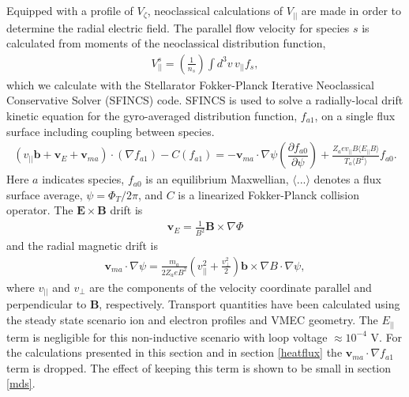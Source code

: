 \documentclass{article}
\newcommand{\partder}[2]{\dfrac{\partial  #1}{\partial  #2}} %
\begin{document}
Equipped with a profile of $V_{\zeta}$, neoclassical calculations of $V_{||}$ are made in order to determine the radial electric field. The parallel flow velocity for species $s$ is calculated from moments of the neoclassical distribution function,
\begin{gather}
V^s_{||} = \left(\frac{1}{n_s}\right
) \int d^3 v \, v_{||} f_s,
\end{gather}
which we calculate with the Stellarator Fokker-Planck Iterative Neoclassical Conservative Solver (SFINCS) \cite{Landreman2014} code.
SFINCS is used to solve a radially-local drift kinetic equation for the gyro-averaged distribution function, $f_{a1}$, on a single flux surface including coupling between species. 
\begin{gather}
( v_{||} \bm{b} + \bm{v}_E + \bm{v}_{ma}) \cdot (\nabla f_{a1})  - C(f_{a1}) = - \bm{v}_{ma} \cdot \nabla \psi \left( \partder{f_{a0}}{\psi} \right) + \frac{Z_a e v_{||} B \langle E_{||} B \rangle}{T_a \langle B^2 \rangle } f_{a0}.
\end{gather} \label{kineticequation}
\hspace{-1mm}
Here $a$ indicates species, $f_{a0}$ is an equilibrium Maxwellian, $ \langle ... \rangle$ denotes a flux surface average, $\psi = \Phi_T/2\pi$, and $C$ is a linearized Fokker-Planck collision operator. The $\bm{E} \times \bm{B}$ drift is 
\begin{gather}
\bm{v}_E = \frac{1}{B^2} \bm{B} \times \nabla \Phi
\end{gather} 
and the radial magnetic drift is
\begin{gather}
\bm{v}_{ma} \cdot \nabla \psi = \frac{m_a }{2Z_a e B^2} \left(v_{||}^2 + \frac{v_{\perp}^2}{2} \right) \bm{b} \times \nabla B \cdot \nabla \psi,
\end{gather} \label{magneticdrift}
where $v_{||}$ and $v_{\perp}$ are the components of the velocity coordinate parallel and perpendicular to $\bm{B}$, respectively. Transport quantities have been calculated using the steady state scenario ion and electron profiles and VMEC geometry. The $E_{||}$ term is negligible for this non-inductive scenario with loop voltage $ \approx 10^{-4}$ V. For the calculations presented in this section and in section \ref{heatflux} the $\bm{v}_{ma} \cdot \nabla f_{a1}$ term is dropped. The effect of keeping this term is shown to be small in section \ref{mds}.
\end{document}
